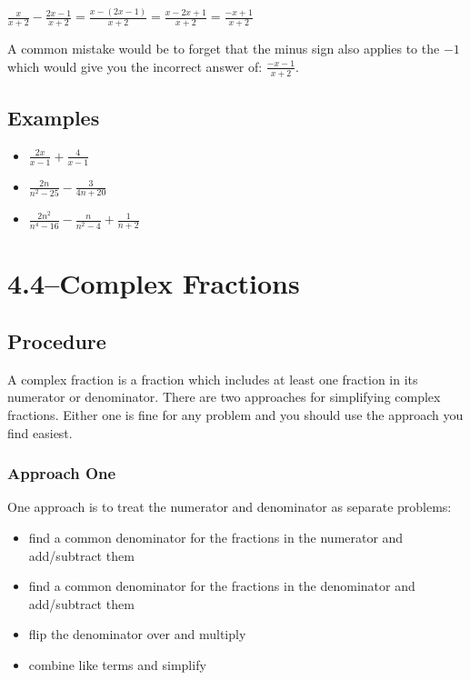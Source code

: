 \documentclass[fleqn,addpoints]{exam}
\begin{document}
\( \displaystyle \frac{x}{x+2} - \frac{2x - 1}{x+2} = \frac{x - (2x - 1)}{x+2} = \frac{x-2x+1}{x+2} = \frac{-x+1}{x+2} \)

A common mistake would be to forget that the minus sign also applies to the $-1$ which would give you the incorrect
answer of: \( \displaystyle \frac{-x-1}{x+2} \).

\subsection{Examples}
\begin{itemize}
  \item \( \displaystyle \frac{2x}{x-1} + \frac{4}{x-1} \)
  \item \( \displaystyle \frac{2n}{n^2-25} - \frac{3}{4n+20} \)
  \item \( \displaystyle \frac{2n^2}{n^4-16} - \frac{n}{n^2-4} + \frac{1}{n+2}\)
\end{itemize}

\section{4.4--Complex Fractions}

\subsection{Procedure}
A complex fraction is a fraction which includes at least one fraction in its numerator or denominator.  There are two
approaches for simplifying complex fractions.  Either one is fine for any problem and you should use the approach you
find easiest.

\subsubsection{Approach One}

One approach is to treat the numerator and denominator as separate problems:
\begin{itemize}
  \item find a common denominator for the fractions in the numerator and add/subtract them
  \item find a common denominator for the fractions in the denominator and add/subtract them
  \item flip the denominator over and multiply 
  \item combine like terms and simplify
\end{itemize}
\end{document}
